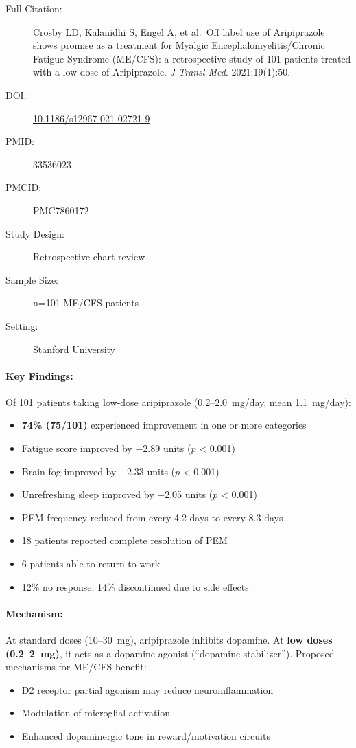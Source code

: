 \begin{description}
    \item[Full Citation:] Crosby LD, Kalanidhi S, Engel A, et al.\ Off label use of Aripiprazole shows promise as a treatment for Myalgic Encephalomyelitis/Chronic Fatigue Syndrome (ME/CFS): a retrospective study of 101 patients treated with a low dose of Aripiprazole. \textit{J Transl Med}. 2021;19(1):50.
    \item[DOI:] \href{https://doi.org/10.1186/s12967-021-02721-9}{10.1186/s12967-021-02721-9}
    \item[PMID:] 33536023
    \item[PMCID:] PMC7860172
    \item[Study Design:] Retrospective chart review
    \item[Sample Size:] n=101 ME/CFS patients
    \item[Setting:] Stanford University
\end{description}

\paragraph{Key Findings:}
Of 101 patients taking low-dose aripiprazole (0.2--2.0~mg/day, mean 1.1~mg/day):
\begin{itemize}
    \item \textbf{74\% (75/101)} experienced improvement in one or more categories
    \item Fatigue score improved by $-$2.89 units ($p$ < 0.001)
    \item Brain fog improved by $-$2.33 units ($p$ < 0.001)
    \item Unrefreshing sleep improved by $-$2.05 units ($p$ < 0.001)
    \item PEM frequency reduced from every 4.2 days to every 8.3 days
    \item 18 patients reported complete resolution of PEM
    \item 6 patients able to return to work
    \item 12\% no response; 14\% discontinued due to side effects
\end{itemize}

\paragraph{Mechanism:}
At standard doses (10--30~mg), aripiprazole inhibits dopamine. At \textbf{low doses (0.2--2~mg)}, it acts as a dopamine agonist (``dopamine stabilizer''). Proposed mechanisms for ME/CFS benefit:
\begin{itemize}
    \item D2 receptor partial agonism may reduce neuroinflammation
    \item Modulation of microglial activation
    \item Enhanced dopaminergic tone in reward/motivation circuits
\end{itemize}

